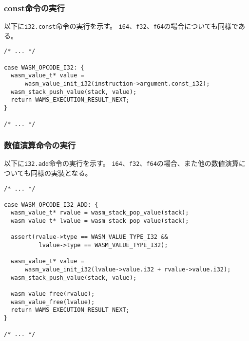 \subsubsection{const命令の実行}

以下に\verb|i32.const|命令の実行を示す。
\verb|i64|、\verb|f32|、\verb|f64|の場合についても同様である。

\begin{lstlisting}[caption=命令の実装,label=lst:parse_sleb128]
/* ... */

case WASM_OPCODE_I32: {
  wasm_value_t* value =
      wasm_value_init_i32(instruction->argument.const_i32);
  wasm_stack_push_value(stack, value);
  return WAMS_EXECUTION_RESULT_NEXT;
}

/* ... */
\end{lstlisting}

\subsubsection{数値演算命令の実行}

以下に\verb|i32.add|命令の実行を示す。
\verb|i64|、\verb|f32|、\verb|f64|の場合、また他の数値演算についても同様の実装となる。

\begin{lstlisting}[caption=命令の実装,label=lst:parse_sleb128]
/* ... */

case WASM_OPCODE_I32_ADD: {
  wasm_value_t* rvalue = wasm_stack_pop_value(stack);
  wasm_value_t* lvalue = wasm_stack_pop_value(stack);

  assert(rvalue->type == WASM_VALUE_TYPE_I32 &&
          lvalue->type == WASM_VALUE_TYPE_I32);

  wasm_value_t* value =
      wasm_value_init_i32(lvalue->value.i32 + rvalue->value.i32);
  wasm_stack_push_value(stack, value);

  wasm_value_free(rvalue);
  wasm_value_free(lvalue);
  return WAMS_EXECUTION_RESULT_NEXT;
}

/* ... */
\end{lstlisting}

